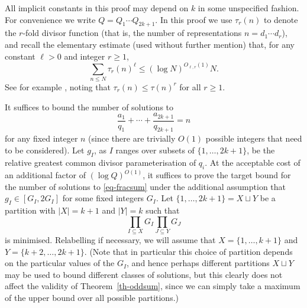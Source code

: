 \documentclass[11pt,letterpaper]{amsart}
\newcommand{\abs}[1]{\left\lvert #1\right\rvert}
\theoremstyle{definition}
\begin{document}
All implicit constants in this proof may depend on $k$ in some unspecified fashion. For convenience we write $Q=Q_1\cdots Q_{2k+1}$. In this proof we use $\tau_r(n)$ to denote the $r$-fold divisor function (that is, the number of representations $n=d_1\cdots d_r$), and recall the elementary estimate (used without further mention) that, for any constant $\ell>0$ and integer $r\geq 1$,
\begin{equation}\label{eq-divbound}
\sum_{n\leq N}\tau_r(n)^\ell \leq (\log N)^{O_{\ell,r}(1)}N.
\end{equation}
See for example \cite[equation (2.31)]{MV06}, noting that $\tau_r(n) \le \tau(n)^r$ for all $r \ge 1$.

It suffices to bound the number of solutions to 
\begin{equation}\label{eq-fracsum}
\frac{a_1}{q_1}+\cdots+\frac{a_{2k+1}}{q_{2k+1}}=n
\end{equation}
for any fixed integer $n$ (since there are trivially $O(1)$ possible integers that need to be considered). Let $g_I$, as $I$ ranges over subsets of $\{1,\ldots,2k+1\}$, be the relative greatest common divisor parameterisation of $q_i$. At the acceptable cost of an additional factor of $(\log Q)^{O(1)}$, it suffices to prove the target bound for the number of solutions to \eqref{eq-fracsum} under the additional assumption that $g_I\in [G_I,2G_I]$ for some fixed integers $G_I$. Let $\{1,\ldots,2k+1\}=X\sqcup Y$ be a partition with $\abs{X}=k+1$ and $\abs{Y}=k$ such that 
\begin{equation}\label{eq-minim}
\prod_{I\subseteq X}G_I \prod_{J\subseteq Y}G_J
\end{equation}
is minimised. Relabelling if necessary, we will assume that $X=\{1,\ldots,k+1\}$ and $Y=\{k+2,\ldots,2k+1\}$. (Note that in particular this choice of partition depends on the particular values of the $G_I$, and hence perhaps different partitions $X\sqcup Y$ may be used to bound different classes of solutions, but this clearly does not affect the validity of Theorem~\ref{th-oddsum}, since we can simply take a maximum of the upper bound over all possible partitions.)
\end{document}

